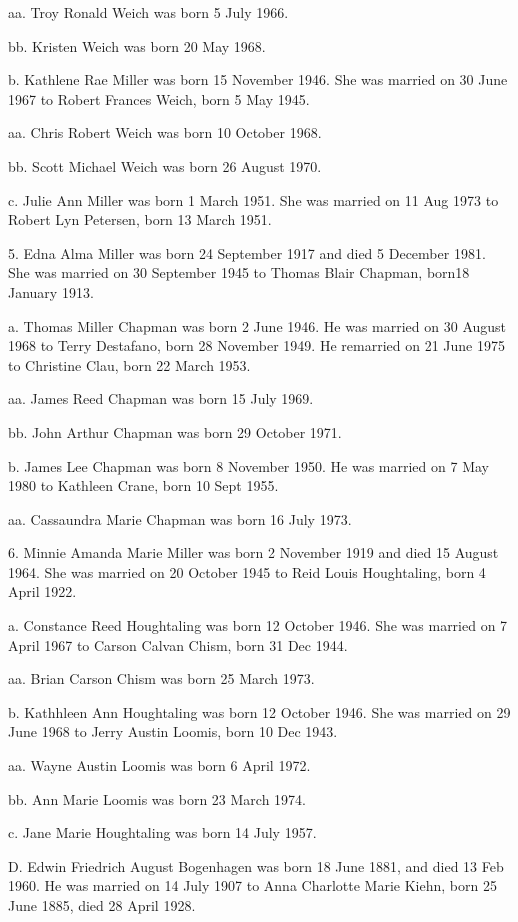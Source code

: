 \documentclass[a4paper]{article}
\begin{document}
aa. Troy Ronald Weich was born 5 July 1966.

bb. Kristen Weich was born 20 May 1968.

b. Kathlene Rae Miller  was born 15 November 1946.  She was married on 30 June 1967 to Robert Frances Weich, born 5 May 1945.
 
aa. Chris Robert Weich was born 10 October 1968.

bb. Scott Michael Weich was born 26 August 1970.

c. Julie Ann Miller was born 1 March 1951.  She was married on 11 Aug 1973 to Robert Lyn Petersen, born 13 March 1951.
 
5. Edna Alma Miller was born 24 September 1917 and died 5 December 1981. She was married on 30 September 1945 to Thomas Blair Chapman, born18 January 1913.
 
a. Thomas Miller Chapman was born 2 June 1946.  He was married on 30 August 1968 to Terry Destafano, born 28 November 1949.  He remarried on 21 June 1975 to Christine Clau, born 22 March 1953.  
			
aa. James Reed Chapman was born 15 July 1969.

bb. John Arthur Chapman was born 29 October 1971.

b. James Lee Chapman was born 8 November 1950.  He was married on 7 May 1980 to Kathleen Crane, born 10 Sept 1955.
 
aa. Cassaundra Marie Chapman was born 16 July 1973.

6. Minnie Amanda Marie Miller was born 2 November 1919 and died 15 August 1964.  She was married on 20 October 1945 to Reid Louis Houghtaling, born 4 April 1922. 

a. Constance Reed Houghtaling was born 12 October 1946.  She was married on 7 April 1967 to Carson Calvan Chism, born 31 Dec 1944.
 
aa. Brian Carson Chism was born 25 March 1973.

b. Kathhleen Ann Houghtaling was born 12 October 1946.  She was married on 29 June 1968 to Jerry Austin Loomis, born 10 Dec 1943.
 
aa. Wayne Austin Loomis was born 6 April 1972.

bb. Ann Marie Loomis was born 23 March 1974.

c. Jane Marie Houghtaling was born 14 July 1957.  

D. Edwin Friedrich August Bogenhagen was born 18 June 1881, and died 13 Feb 1960. He was married on 14 July 1907 to Anna Charlotte Marie Kiehn, born 25 June 1885, died 28 April 1928.
\end{document}

